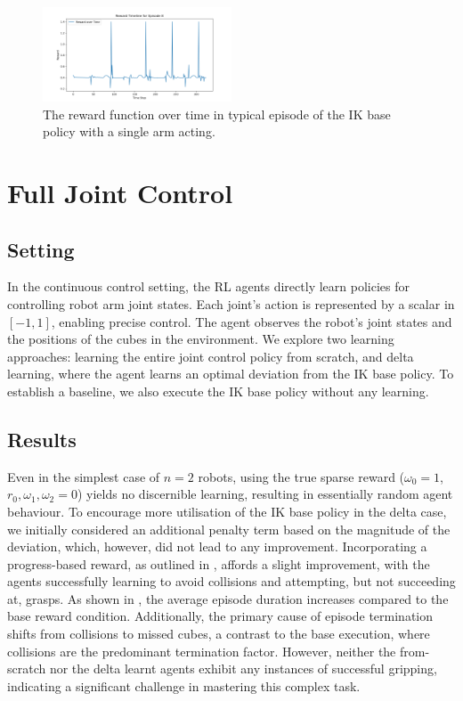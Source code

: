 \documentclass[conference,a4paper]{IEEEtran}
\begin{document}
\begin{figure}
  \centering
  \includegraphics[width=0.5\textwidth]{figures/reward_timeline.png}
    \caption{The reward function over time in typical episode of the IK base policy with a single arm acting.}
  \label{fig:reward-timeline}
\end{figure}


\section{Full Joint Control}

\label{sec:continuous}

\subsection{Setting}

In the continuous control setting, the RL agents directly learn policies for controlling robot arm joint states. 
Each joint's action is represented by a scalar in \([-1,1]\), enabling precise control. The agent observes the robot's joint states and the positions of the cubes in the environment. 
We explore two learning approaches: learning the entire joint control policy from scratch, and delta learning, where the agent learns an optimal deviation from the IK base policy. 
To establish a baseline, we also execute the IK base policy without any learning.


\subsection{Results}

Even in the simplest case of \(n = 2\) robots, using the true sparse reward (\( \omega_0 = 1\), \(r_0, \omega_1, \omega_2 = 0\)) yields no discernible learning, resulting in essentially random agent behaviour. 
To encourage more utilisation of the IK base policy in the delta case, we initially considered an additional penalty term based on the magnitude of the deviation, which, however, did not lead to any improvement.
Incorporating a progress-based reward, as outlined in , affords a slight improvement, with the agents successfully learning to avoid collisions and attempting, but not succeeding at, grasps. 
As shown in , the average episode duration increases compared to the base reward condition. 
Additionally, the primary cause of episode termination shifts from collisions to missed cubes, a contrast to the base execution, where collisions are the predominant termination factor. 
However, neither the from-scratch nor the delta learnt agents exhibit any instances of successful gripping, indicating a significant challenge in mastering this complex task.
\end{document}
